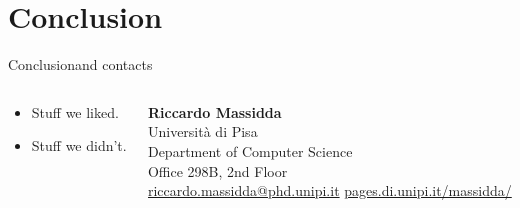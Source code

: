 \section{Conclusion}

\begin{frame}{Conclusion}{and contacts }
  \centering
  \begin{columns}
    \begin{column}{0.55\textwidth}
      \begin{itemize}
        \item Stuff we liked.
        \item Stuff we didn't.
      \end{itemize}
    \end{column}
    \begin{column}{0.45\textwidth}
      \pause\textbf{Riccardo Massidda}\\
      {Università di Pisa}\\
      {Department of Computer Science}\\
      {Office 298B, 2nd Floor}\\[1em]
      \href{mailto:riccardo.massidda@phd.unipi.it}{riccardo.massidda@phd.unipi.it}
      \href{https://pages.di.unipi.it/massidda/}{pages.di.unipi.it/massidda/}
    \end{column}
  \end{columns}
\end{frame}

